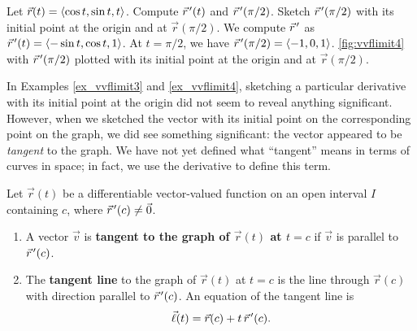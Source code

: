 \begin{example}\label{ex_vvflimit4}%
Let $\vec r(t) =\left\langle \cos t, \sin t, t\right\rangle$. Compute $\vec r\hskip1.25pt '(t)$ and $\vec r\hskip1.25pt '(\pi/2)$. Sketch $\vec r\hskip1.25pt '(\pi/2)$ with its initial point at the origin and at $\vec r(\pi/2)$.
\solution
We compute $\vec r\hskip1.25pt '$ as $\vec r\hskip1.25pt '(t) =\left\langle -\sin t, \cos t, 1\right\rangle$. At $t= \pi/2$, we have $\vec r\hskip1.25pt '(\pi/2) =\left\langle -1,0,1\right\rangle$. \autoref{fig:vvflimit4}
\iftoggle{in_threeD}{shows a graph of $\vec r(t)$,}{shows two graphs of $\vec r(t)$, from different perspectives,}
with $\vec r\hskip1.25pt '(\pi/2)$ plotted with its initial point at the origin and at $\vec r(\pi/2)$.
\end{example}

In Examples \ref{ex_vvflimit3} and \ref{ex_vvflimit4}, sketching a particular derivative with its initial point at the origin did not seem to reveal anything significant. However, when we sketched the vector with its initial point on the corresponding point on the graph, we did see something significant: the vector appeared to be \emph{tangent} to the graph. We have not yet defined what ``tangent'' means in terms of curves in space; in fact, we use the derivative to define this term.

\begin{definition}\label{def:vector_tangent}%
Let $\vec r(t)$ be a differentiable vector-valued function on an open interval $I$ containing $c$, where $\vec r\hskip1.25pt '(c)\neq \vec 0$.
\begin{enumerate}
	\item A vector $\vec v$ is \textbf{tangent to the graph of $\vec r(t)$ at $t=c$} if $\vec v$ is parallel to $\vec r\hskip1.25pt '(c)$.
	\item	The \textbf{tangent line}  to the graph of $\vec r(t)$ at $t=c$ is the line through $\vec r(c)$ with direction parallel to $\vec r\hskip1.25pt '(c)$. An equation of the tangent line is 
	\[\vec \ell(t) = \vec r(c) + t\,\vec r\hskip1.25pt '(c).\]
\end{enumerate}
\end{definition}

